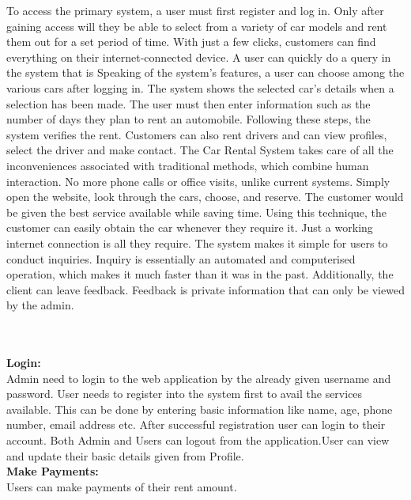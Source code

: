 \documentclass[a4paper,12pt,toc=flat]{report}
\begin{document}
{	To access the primary system, a user must first register and log in. Only after gaining access will they be able to select from a variety of car models and rent them out for a set period of time. With just a few clicks, customers can find everything on their internet-connected device. A user can quickly do a query in the system that is Speaking of the system's features, a user can choose among the various cars after logging in. The system shows the selected car's details when a selection has been made. The user must then enter information such as the number of days they plan to rent an automobile. Following these steps, the system verifies the rent. Customers can also rent drivers and can view profiles, select the driver and make contact. The Car Rental System takes care of all the inconveniences associated with traditional methods, which combine human interaction. No more phone calls or office visits, unlike current systems. Simply open the website, look through the cars, choose, and reserve. The customer would be given the best service available while saving time. Using this technique, the customer can easily obtain the car whenever they require it. Just a working internet connection is all they require. The system makes it simple for users to conduct inquiries. Inquiry is essentially an automated and computerised operation, which makes it much faster than it was in the past. Additionally, the client can leave feedback. Feedback is private information that can only be viewed by the admin.
	
		\\
		
			\vspace*{14pt}\hspace*{-16pt}{\bf Main activities of system are:} \vspace*{6pt}
			\\
				{\bf \hspace{-20pt} Login:}
				\\
	            Admin need to login to the web application by the already given username and password. User needs to register into the system first to avail the services available. This can be done by entering basic information like name, age, phone number, email address etc. After successful registration user can login to their account. Both Admin and Users can logout from the application.User can view and update their basic details given from Profile.
	            \\
	            		
				{\bf \hspace{-20pt}Make Payments:}
				\\
	            Users can make payments of their rent amount.
	            \\
	            
}
\end{document}
